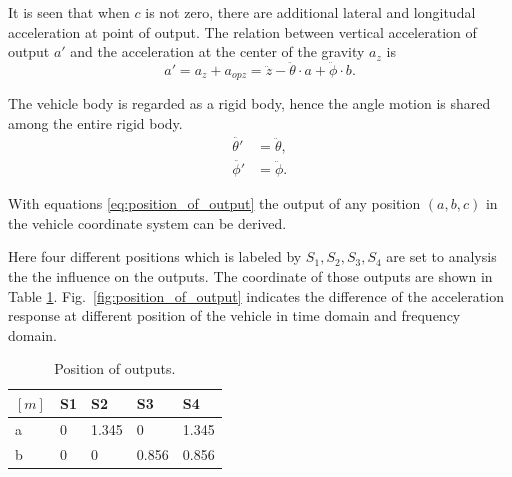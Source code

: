  It is seen that when $c$ is not zero, there are additional lateral and longitudal acceleration at point of output. 
 The relation between vertical acceleration of output $a'$ and the acceleration at the center of the gravity $a_{z}$ is
 \begin{equation}
     a' = a_{z}+a_{opz} = \ddot{z}-\ddot{\theta}\cdot a+\ddot{\phi}\cdot b.
 \label{eq:position_of_output}
 \end{equation}
 
 The vehicle body is regarded as a rigid body, hence the angle motion is shared among the entire rigid body.
 \begin{align}
    \ddot{\theta'} &= \ddot{\theta},\\
    \ddot{\phi'}&=\ddot{\phi}.
 \end{align}
 
 With equations \ref{eq:position_of_output} the output of any position $(a,b,c)$ in the vehicle coordinate system can be derived.
 
 Here four different positions which is labeled by $S_1, S_2, S_3, S_4$ are set to analysis the the influence on the outputs.
 The coordinate of those outputs are shown in Table \ref{tbl:position of outputs}.
 Fig.~\ref{fig:position_of_output} indicates the difference of the acceleration response at different position of the vehicle in time domain and frequency domain.
  
 \begin{table}
 \centering
 \caption{Position of outputs.}
 \label{tbl:position of outputs}
 \begin{tabular}{lllll}
 \hline
 $[m]$ & S1 & S2 & S3 & S4 \\ \hline
 a & 0 & 1.345 & 0 & 1.345 \\
 b & 0 & 0 & 0.856 & 0.856 \\ \hline
 \end{tabular}
 \end{table}
 
